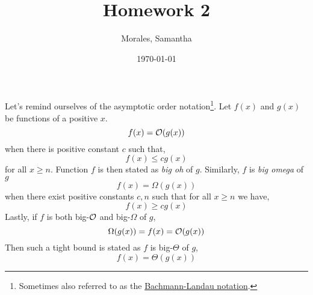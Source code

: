 \documentclass{homework}
\author{Morales, Samantha}
\date{\today}
\title{Homework 2}
\begin{document}
 \maketitle

Let's remind ourselves of the asymptotic order
notation\footnote{Sometimes also referred to as the
  \href{https://en.wikipedia.org/wiki/Big_O_notation}{Bachmann-Landau
    notation}.}. Let $f(x)$ and $g(x)$ be functions of a positive $x$.
\[
  f(x) = \mathcal{O}(g(x))
\]
when there is positive constant $c$ such that,
\[
  f(x) \leq cg(x)
\]
for all $x \geq n$. Function $f$ is then stated as \textit{big oh}
of $g$. Similarly, $f$ is \textit{big omega} of $g$ \ie
\[
  f(x) = \Omega(g(x))
\]
when there exist positive constants $c, n$ such that for all $x
  \geq n$ we have,
\[
  f(x) \geq cg(x)
\]
Lastly, if $f$ is both big-$\mathcal{O}$ and big-$\Omega$ of $g$,
\[
  \Omega(g(x)) = f(x) = \mathcal{O}(g(x))
\]
Then such a tight bound is stated as $f$ is big-$\Theta$ of $g$,
\[
  f(x) = \Theta(g(x))
\]
\end{document}
